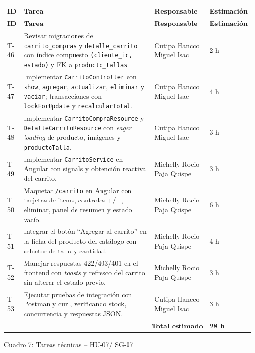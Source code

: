 \documentclass[12pt,a4paper]{article}
\begin{document}
{\small
\begin{longtable}{p{1.2cm} p{7.9cm} p{4.2cm} p{1.7cm}}
\toprule
\textbf{ID} & \textbf{Tarea} & \textbf{Responsable} & \textbf{Estimación} \\
\midrule
\endfirsthead

\toprule
\textbf{ID} & \textbf{Tarea} & \textbf{Responsable} & \textbf{Estimación} \\
\midrule
\endhead

\bottomrule
\endlastfoot

T-46 & Revisar migraciones de \texttt{carrito\_compras} y \texttt{detalle\_carrito} con índice compuesto \texttt{(cliente\_id, estado)} y FK a \texttt{producto\_tallas}. & Cutipa Hancco Miguel Isac & 2 h \\
T-47 & Implementar \texttt{CarritoController} con \texttt{show}, \texttt{agregar}, \texttt{actualizar}, \texttt{eliminar} y \texttt{vaciar}; transacciones con \texttt{lockForUpdate} y \texttt{recalcularTotal}. & Cutipa Hancco Miguel Isac & 4 h \\
T-48 & Implementar \texttt{CarritoCompraResource} y \texttt{DetalleCarritoResource} con \textit{eager loading} de producto, imágenes y \texttt{productoTalla}. & Cutipa Hancco Miguel Isac & 3 h \\
T-49 & Implementar \texttt{CarritoService} en Angular con signals y obtención reactiva del carrito. & Michelly Rocio Paja Quispe & 3 h \\
T-50 & Maquetar \texttt{/carrito} en Angular con tarjetas de items, controles +/−, eliminar, panel de resumen y estado vacío. & Michelly Rocio Paja Quispe & 6 h \\
T-51 & Integrar el botón ``Agregar al carrito'' en la ficha del producto del catálogo con selector de talla y cantidad. & Michelly Rocio Paja Quispe & 4 h \\
T-52 & Manejar respuestas 422/403/401 en el frontend con \textit{toasts} y refresco del carrito sin alterar el estado previo. & Michelly Rocio Paja Quispe & 3 h \\
T-53 & Ejecutar pruebas de integración con Postman y curl, verificando stock, concurrencia y respuestas JSON. & Cutipa Hancco Miguel Isac & 3 h \\

\midrule
\multicolumn{3}{r}{\textbf{Total estimado}} & \textbf{28 h} \\

\end{longtable}
}

\begin{center}
\small Cuadro 7: Tareas técnicas -- HU-07/ SG-07
\end{center}
\end{document}
